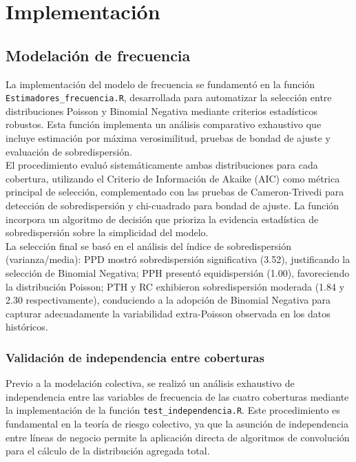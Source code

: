 \section{Implementación}

\subsection{Modelación de frecuencia}

La implementación del modelo de frecuencia se fundamentó en la función \texttt{Estimadores\_frecuencia.R}, desarrollada para automatizar la selección entre distribuciones Poisson y Binomial Negativa mediante criterios estadísticos robustos. Esta función implementa un análisis comparativo exhaustivo que incluye estimación por máxima verosimilitud, pruebas de bondad de ajuste y evaluación de sobredispersión.\\

El procedimiento evaluó sistemáticamente ambas distribuciones para cada cobertura, utilizando el Criterio de Información de Akaike (AIC) como métrica principal de selección, complementado con las pruebas de Cameron-Trivedi para detección de sobredispersión y chi-cuadrado para bondad de ajuste. La función incorpora un algoritmo de decisión que prioriza la evidencia estadística de sobredispersión sobre la simplicidad del modelo.\\

La selección final se basó en el análisis del índice de sobredispersión (varianza/media): PPD mostró sobredispersión significativa (3.52), justificando la selección de Binomial Negativa; PPH presentó equidispersión (1.00), favoreciendo la distribución Poisson; PTH y RC exhibieron sobredispersión moderada (1.84 y 2.30 respectivamente), conduciendo a la adopción de Binomial Negativa para capturar adecuadamente la variabilidad extra-Poisson observada en los datos históricos.

\subsubsection{Validación de independencia entre coberturas}

Previo a la modelación colectiva, se realizó un análisis exhaustivo de independencia entre las variables de frecuencia de las cuatro coberturas mediante la implementación de la función \texttt{test\_independencia.R}. Este procedimiento es fundamental en la teoría de riesgo colectivo, ya que la asunción de independencia entre líneas de negocio permite la aplicación directa de algoritmos de convolución para el cálculo de la distribución agregada total.\\

